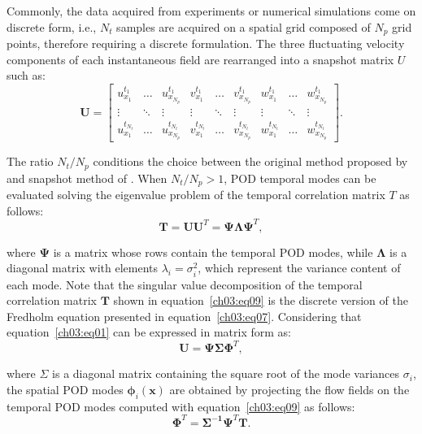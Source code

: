 Commonly, the data acquired from experiments or numerical simulations come on discrete form, i.e., $N_t$ samples are acquired on a spatial grid composed of $N_p$ grid points, therefore requiring a discrete formulation.
The three fluctuating velocity components of each instantaneous field are rearranged into a snapshot matrix $U$ such as:
\begin{equation}
    \mathbf{U}=\begin{bmatrix}
    u_{x_1}^{t_1} & \dots  & u_{x_{N_p}}^{t_1} & v_{x_1}^{t_1} & \dots  & v_{x_{N_p}}^{t_1} & w_{x_1}^{t_1} & \dots  & w_{x_{N_p}}^{t_1}\\
    \vdots         & \ddots & \vdots         & \vdots         & \ddots & \vdots  & \vdots         & \ddots & \vdots \\
    u_{x_1}^{t_{N_t}} & \dots  & u_{x_{N_p}}^{t_{N_t}} & v_{x_1}^{t_{N_t}} & \dots  & v_{x_{N_p}}^{t_{N_t}}  & w_{x_1}^{t_{N_t}} & \dots  & w_{x_{N_p}}^{t_{N_t}}
    \end{bmatrix}.
    \label{ch03:eq08}
\end{equation}

The ratio $N_t/N_p$ conditions the choice between the original method proposed by \citet{lumley1967structure} and snapshot method of \citet{sirovich1987turbulence}.
When $N_t/N_p>1$, POD temporal modes can be evaluated solving the eigenvalue problem of the temporal correlation matrix $T$ as follows:
\begin{equation}
    \mathbf{T}=\mathbf{U}\mathbf{U}^T=\boldsymbol{\Psi}\boldsymbol{\Lambda}\boldsymbol{\Psi}^T,
    \label{ch03:eq09}
\end{equation}

\noindent where $\boldsymbol{\Psi}$ is a matrix whose rows contain the temporal POD modes, while $\boldsymbol{\Lambda}$ is a diagonal matrix with elements $\lambda_i=\sigma_i^2$, which represent the variance content of each mode.
Note that the singular value decomposition of the temporal correlation matrix $\mathbf{T}$ shown in equation~\ref{ch03:eq09} is the discrete version of the Fredholm equation presented in equation~\ref{ch03:eq07}.
Considering that equation~\ref{ch03:eq01} can be expressed in matrix form as:
\begin{equation}
  \boldsymbol{U} =  \boldsymbol{\Psi}\boldsymbol{\Sigma}\boldsymbol{\Phi}^T,
  \label{ch03:eq10}
\end{equation}

\noindent where $\Sigma$ is a diagonal matrix containing the square root of the mode variances $\sigma_i$, the spatial POD modes $\boldsymbol{\phi}_i(\boldsymbol{x})$ are obtained by projecting the flow fields on the temporal POD modes computed with equation~\ref{ch03:eq09} as follows:
\begin{equation}
  \mathbf{\Phi}^T =   \mathbf{\Sigma^{-1}}\mathbf{\Psi}^T\mathbf{T}.
  \label{ch03:eq11}
\end{equation}

